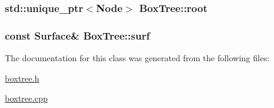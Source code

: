 \subsubsection[{\texorpdfstring{root}{root}}]{\setlength{\rightskip}{0pt plus 5cm}std\+::unique\+\_\+ptr$<${\bf Node}$>$ Box\+Tree\+::root\hspace{0.3cm}{\ttfamily [private]}}\hypertarget{classBoxTree_a12ff787723bc271b246f2662ce7c59b5}{}\label{classBoxTree_a12ff787723bc271b246f2662ce7c59b5}
\subsubsection[{\texorpdfstring{surf}{surf}}]{\setlength{\rightskip}{0pt plus 5cm}const {\bf Surface}\& Box\+Tree\+::surf\hspace{0.3cm}{\ttfamily [private]}}\hypertarget{classBoxTree_a5c38df1ae1af50fa873ebde61b24df67}{}\label{classBoxTree_a5c38df1ae1af50fa873ebde61b24df67}


The documentation for this class was generated from the following files\+:\begin{DoxyCompactItemize}
\item 
\hyperlink{boxtree_8h}{boxtree.\+h}\item 
\hyperlink{boxtree_8cpp}{boxtree.\+cpp}\end{DoxyCompactItemize}
